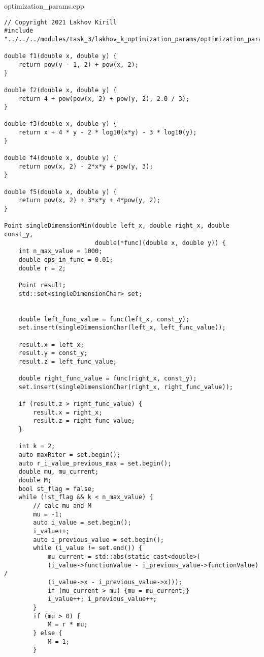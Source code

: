 \documentclass{report}
\begin{document}
optimization\_params.cpp
\begin{lstlisting}
// Copyright 2021 Lakhov Kirill
#include "../../../modules/task_3/lakhov_k_optimization_params/optimization_params.h"

double f1(double x, double y) {
    return pow(y - 1, 2) + pow(x, 2);
}

double f2(double x, double y) {
    return 4 + pow(pow(x, 2) + pow(y, 2), 2.0 / 3);
}

double f3(double x, double y) {
    return x + 4 * y - 2 * log10(x*y) - 3 * log10(y);
}

double f4(double x, double y) {
    return pow(x, 2) - 2*x*y + pow(y, 3);
}

double f5(double x, double y) {
    return pow(x, 2) + 3*x*y + 4*pow(y, 2);
}

Point singleDimensionMin(double left_x, double right_x, double const_y,
                         double(*func)(double x, double y)) {
    int n_max_value = 1000;
    double eps_in_func = 0.01;
    double r = 2;

    Point result;
    std::set<singleDimensionChar> set;


    double left_func_value = func(left_x, const_y);
    set.insert(singleDimensionChar(left_x, left_func_value));

    result.x = left_x;
    result.y = const_y;
    result.z = left_func_value;

    double right_func_value = func(right_x, const_y);
    set.insert(singleDimensionChar(right_x, right_func_value));

    if (result.z > right_func_value) {
        result.x = right_x;
        result.z = right_func_value;
    }

    int k = 2;
    auto maxRiter = set.begin();
    auto r_i_value_previous_max = set.begin();
    double mu, mu_current;
    double M;
    bool st_flag = false;
    while (!st_flag && k < n_max_value) {
        // calc mu and M
        mu = -1;
        auto i_value = set.begin();
        i_value++;
        auto i_previous_value = set.begin();
        while (i_value != set.end()) {
            mu_current = std::abs(static_cast<double>(
            (i_value->functionValue - i_previous_value->functionValue) /
            (i_value->x - i_previous_value->x)));
            if (mu_current > mu) {mu = mu_current;}
            i_value++; i_previous_value++;
        }
        if (mu > 0) {
            M = r * mu;
        } else {
            M = 1;
        }


\end{lstlisting}
\end{document}

